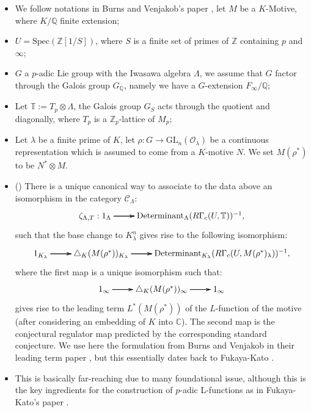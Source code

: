 \documentclass[11pt]{report}
\begin{document}
\begin{itemize}
\item<1-> 	We follow notations in Burns and Venjakob's paper \cite[Section 4.2, Section 4.3]{BV}, let $M$ be a $K$-Motive, where $K/\mathbb{Q}$ finite extension;

\item<2-> 	$U=\mathrm{Spec}(\mathbb{Z}[1/S])$, where $S$ is a finite set of primes of $\mathbb{Z}$ containing $p$ and $\infty$;
\item<3-> 	$G$ a $p$-adic Lie group with the Iwasawa algebra $\Lambda$, we assume that $G$ factor through the Galois group $G_\mathbb{Q}$, namely we have a $G$-extension $F_\infty/\mathbb{Q}$;
\item<4-> 	Let $\mathbb{T}:=T_p\otimes \Lambda$, the Galois group $G_S$ acts through the quotient and diagonally, where $T_p$ is a $\mathbb{Z}_p$-lattice of $M_p$;
\item<5-> 	Let $\lambda$ be a finite prime of $K$, let $\rho:G\rightarrow \mathrm{GL}_n(\mathcal{O}_\lambda)$ be a continuous representation which is assumed to come from a $K$-motive $N$. We set $M(\rho^*)$ to be $N^*\otimes M$.
\end{itemize}






\begin{itemize}
\item<1-> () There is a unique canonical way to associate to the data above an isomorphism in the category $\mathcal{C}_\Lambda$:
\[
\xymatrix@R+0pc@C+0pc{
\zeta_{\Lambda,T}:1_\Lambda \ar[r]\ar[r]\ar[r] & \mathrm{Determinant}_\Lambda (R\Gamma_{c}(U,\mathbb{T}))^{-1}, 
}
\]
such that the base change to $K_\lambda^n$ gives rise to the following isomorphism:
\[
\xymatrix@R+0pc@C+0pc{
1_{K_\lambda} \ar[r]\ar[r]\ar[r] & \triangle_{K}(M(\rho^{*}))_{K_\lambda} \ar[r]\ar[r]\ar[r] & \mathrm{Determinant}_{K_\lambda}(R\Gamma_{c}(U,M(\rho^{*})_{\lambda}))^{-1}, 
}
\]
where the first map is a unique isomorphism such that:
\[
\xymatrix@R+0pc@C+0pc{
1_{\infty} \ar[r]\ar[r]\ar[r] & \triangle_{K}(M({\rho}^{*}))_{\infty} \ar[r]\ar[r]\ar[r] & 1_{\infty}
}
\]
gives rise to the leading term $L^*(M({\rho}^*))$ of the $L$-function of the motive (after considering an embedding of $K$ into $\mathbb{C}$). The second map is the conjectural regulator map predicted by the corresponding standard conjecture. We use here the formulation from Burns and Venjakob in their leading term paper \cite{BV}, but this essentially dates back to Fukaya-Kato \cite[Conjecture 2.3.2]{FK}.


\item<2-> This is basically far-reaching due to many foundational issue, although this is the key ingredients for the construction of $p$-adic L-functions as in Fukaya-Kato's paper \cite{FK}.




\end{itemize}
\end{document}
